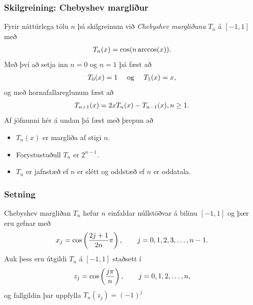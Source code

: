 \documentclass[a4paper,10pt,icelandic]{sphinxmanual}
\begin{document}
\subsubsection{Skilgreining: Chebyshev margliður}
\label{kafli03:index-15}\label{kafli03:skilgreining-chebyshev-margliur}
Fyrir náttúrlega tölu \(n\) þá skilgreinum við
\emph{Chebyshev margliðuna} \(T_n\) á \([-1,1]\) með
\begin{gather}
\begin{split}T_n(x) = \cos(n \arccos(x)).\end{split}\notag
\end{gather}
Með því að setja inn \(n=0\) og \(n=1\) þá fæst að
\begin{gather}
\begin{split}T_0(x) = 1 \quad \text{ og } \quad T_1(x) = x,\end{split}\notag
\end{gather}
og með hornafallareglunum fæst að
\begin{gather}
\begin{split}T_{n+1}(x) = 2xT_n(x) - T_{n-1}(x), n \geq 1.\end{split}\notag
\end{gather}
Af jöfnunni hér á undan þá fæst með þrepun að
\begin{itemize}
\item {} 
\(T_n(x)\) er margliða af stigi \(n\).

\item {} 
Forystustuðull \(T_n\) er \(2^{n-1}\).

\item {} 
\(T_n\) er jafnstæð ef \(n\) er slétt og oddstæð ef \(n\)
er oddatala.

\end{itemize}


\subsubsection{Setning}
\label{kafli03:setning}
Chebyshev margliðan \(T_n\) hefur \(n\) einfaldar
núllstöðvar á bilinu \([-1,1]\) og þær eru gefnar með
\begin{gather}
\begin{split}x_j = \cos\left(\frac{2j+1}{2n}\pi\right),\qquad j=0,1,2,3,\ldots,n-1.\end{split}\notag
\end{gather}
Auk þess eru útgildi \(T_n\) á \([-1,1]\) staðsett í
\begin{gather}
\begin{split}z_j = \cos\left( \frac{j\pi}{n}\right),\qquad j=0,1,2,\ldots,n,\end{split}\notag
\end{gather}
og fallgildin þar uppfylla \(T_n(z_j) = (-1)^j\)
\end{document}

